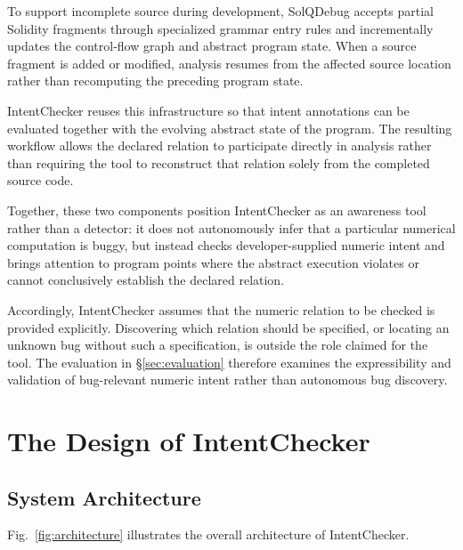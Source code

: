 \documentclass[pdflatex,sn-basic]{sn-jnl}%
\theoremstyle{thmstyleone}%
\theoremstyle{thmstyletwo}%
\theoremstyle{thmstylethree}%
\begin{document}
To support incomplete source during development, SolQDebug accepts partial
Solidity fragments through specialized grammar entry rules and incrementally
updates the control-flow graph and abstract program state.
When a source fragment is added or modified, analysis resumes from the
affected source location rather than recomputing the preceding program state.

IntentChecker reuses this infrastructure so that intent annotations can be
evaluated together with the evolving abstract state of the program.
The resulting workflow allows the declared relation to participate directly in
analysis rather than requiring the tool to reconstruct that relation solely
from the completed source code.

\smallskip
\smallskip
Together, these two components position IntentChecker as an
awareness tool rather than a detector: it does not autonomously infer
that a particular numerical computation is buggy, but instead checks
developer-supplied numeric intent and brings attention to program points where
the abstract execution violates or cannot conclusively establish the declared
relation.

Accordingly, IntentChecker assumes that the numeric relation to be checked is
provided explicitly. Discovering which relation should be specified, or
locating an unknown bug without such a specification, is outside the role
claimed for the tool. The evaluation in \S\ref{sec:evaluation} therefore
examines the expressibility and validation of bug-relevant numeric intent
rather than autonomous bug discovery.

\section{The Design of IntentChecker}\label{sec:design}

\subsection{System Architecture}

Fig.~\ref{fig:architecture} illustrates the overall architecture of IntentChecker.
\end{document}
